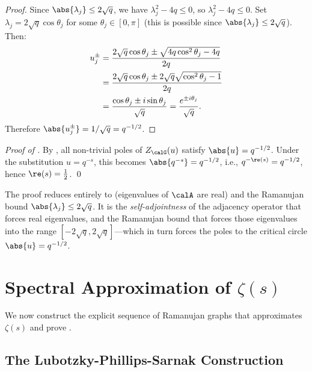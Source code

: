 \documentclass[12pt, a4paper]{article}
\theoremstyle{plain}
\theoremstyle{definition}
\begin{document}
\begin{proof}
  Since $\abs{\lambda_j} \leq 2\sqrt{q}$, we have $\lambda_j^2 - 4q \leq 0$,
  so $\lambda_j^2 - 4q \leq 0$. Set $\lambda_j = 2\sqrt{q}\cos\theta_j$ for
  some $\theta_j \in [0, \pi]$ (this is possible since $\abs{\lambda_j} \leq
  2\sqrt{q}$). Then:
  \begin{align}
    u_j^{\pm} &= \frac{2\sqrt{q}\cos\theta_j \pm \sqrt{4q\cos^2\theta_j - 4q}}{2q}
    \notag \\
    &= \frac{2\sqrt{q}\cos\theta_j \pm 2\sqrt{q}\sqrt{\cos^2\theta_j - 1}}{2q}
    \notag \\
    &= \frac{\cos\theta_j \pm i\sin\theta_j}{\sqrt{q}}
    = \frac{e^{\pm i\theta_j}}{\sqrt{q}}.
  \end{align}
  Therefore $\abs{u_j^{\pm}} = 1/\sqrt{q} = q^{-1/2}$.
\end{proof}

\begin{proof}[Proof of ]
  By , all non-trivial poles of $Z_\calG(u)$ satisfy
  $\abs{u} = q^{-1/2}$.
  Under the substitution $u = q^{-s}$, this becomes
  $\abs{q^{-s}} = q^{-1/2}$, i.e., $q^{-\re(s)} = q^{-1/2}$,
  hence $\re(s) = \frac{1}{2}$. \qed
\end{proof}

\begin{remark}
  The proof reduces entirely to  (eigenvalues of $\calA$
  are real) and the Ramanujan bound $\abs{\lambda_j} \leq 2\sqrt{q}$. It is
  the \emph{self-adjointness} of the adjacency operator that forces real
  eigenvalues, and the Ramanujan bound that forces those eigenvalues into the
  range $[-2\sqrt{q}, 2\sqrt{q}]$---which in turn forces the poles to the
  critical circle $\abs{u} = q^{-1/2}$.
\end{remark}

\section{Spectral Approximation of $\zeta(s)$}\label{sec:approx}

We now construct the explicit sequence of Ramanujan graphs that approximates
$\zeta(s)$ and prove .

\subsection{The Lubotzky-Phillips-Sarnak Construction}
\end{document}
